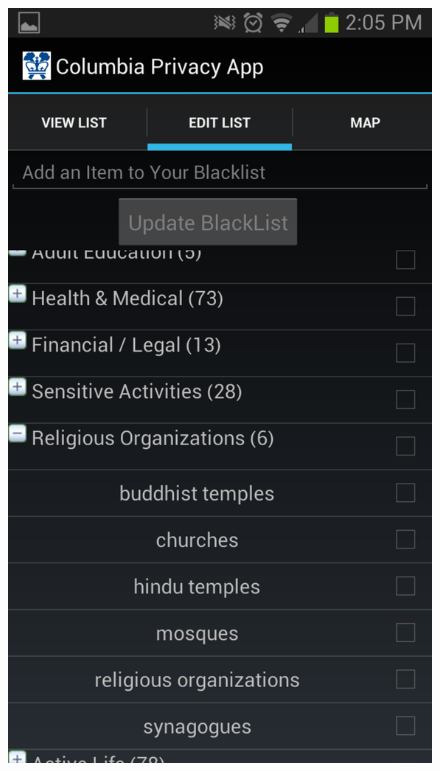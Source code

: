 \begin{figure}
{}
  \centering
  \includegraphics[width=0.75\linewidth]{fig/keyword/screenshot_addlist.pdf}
\endminipage\hfill
{}
  \centering

\end{figure}
